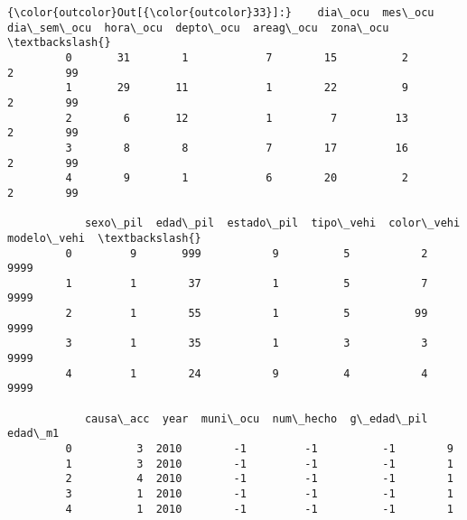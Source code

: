 \documentclass[11pt]{article}
\begin{document}
\begin{Verbatim}[commandchars=\\\{\}]
{\color{outcolor}Out[{\color{outcolor}33}]:}    dia\_ocu  mes\_ocu  dia\_sem\_ocu  hora\_ocu  depto\_ocu  areag\_ocu  zona\_ocu  \textbackslash{}
         0       31        1            7        15          2          2        99   
         1       29       11            1        22          9          2        99   
         2        6       12            1         7         13          2        99   
         3        8        8            7        17         16          2        99   
         4        9        1            6        20          2          2        99   
         
            sexo\_pil  edad\_pil  estado\_pil  tipo\_vehi  color\_vehi  modelo\_vehi  \textbackslash{}
         0         9       999           9          5           2         9999   
         1         1        37           1          5           7         9999   
         2         1        55           1          5          99         9999   
         3         1        35           1          3           3         9999   
         4         1        24           9          4           4         9999   
         
            causa\_acc  year  muni\_ocu  num\_hecho  g\_edad\_pil  edad\_m1  
         0          3  2010        -1         -1          -1        9  
         1          3  2010        -1         -1          -1        1  
         2          4  2010        -1         -1          -1        1  
         3          1  2010        -1         -1          -1        1  
         4          1  2010        -1         -1          -1        1  
\end{Verbatim}
            
\end{document}
